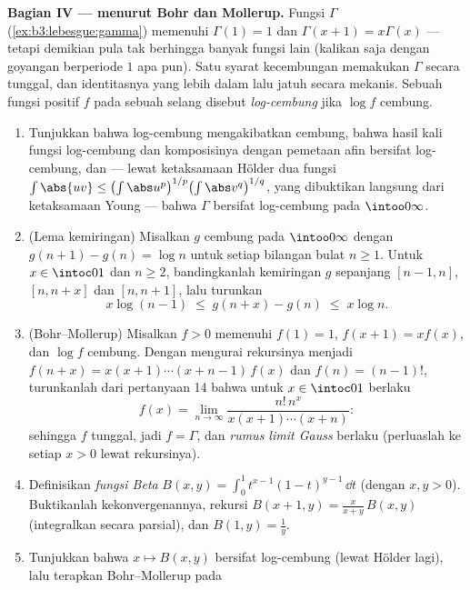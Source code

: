 \begin{problem}
\medskip
\noindent\textbf{Bagian IV ---  menurut
Bohr dan Mollerup.} Fungsi $\Gamma$
(\cref{ex:b3:lebesgue:gamma}) memenuhi $\Gamma(1) = 1$ dan
$\Gamma(x+1) = x\Gamma(x)$ --- tetapi demikian pula tak berhingga banyak
fungsi lain (kalikan saja dengan goyangan berperiode $1$ apa pun). Satu syarat
kecembungan memakukan $\Gamma$ secara tunggal, dan
identitasnya yang lebih dalam lalu jatuh secara mekanis. Sebuah fungsi positif $f$
pada sebuah selang disebut \emph{log-cembung} jika $\log f$ cembung.
\begin{enumerate}[resume]
  \item Tunjukkan bahwa log-cembung mengakibatkan cembung, bahwa hasil kali
        fungsi log-cembung dan komposisinya dengan pemetaan
        afin bersifat log-cembung, dan --- lewat
        ketaksamaan Hölder dua fungsi $\int\abs{uv} \leq
        \bigl(\int\abs u^p\bigr)^{1/p}\bigl(\int\abs
        v^q\bigr)^{1/q}$, yang dibuktikan langsung dari ketaksamaan
        Young --- bahwa $\Gamma$ bersifat log-cembung pada
        $\intoo0\infty$.
  \item (Lema kemiringan) Misalkan $g$ cembung pada $\intoo0\infty$
        dengan $g(n+1) - g(n) = \log n$ untuk setiap bilangan bulat $n
        \geq 1$. Untuk $x \in \intoc01$ dan $n \geq 2$, bandingkanlah
        kemiringan $g$ sepanjang $[n-1, n]$, $[n, n+x]$ dan
        $[n, n+1]$, lalu turunkan
        \[
        x\log(n-1) \;\leq\; g(n + x) - g(n) \;\leq\; x\log n .
        \]
  \item (Bohr--Mollerup) Misalkan $f > 0$ memenuhi $f(1) = 1$,
        $f(x+1) = xf(x)$, dan $\log f$ cembung. Dengan mengurai
        rekursinya menjadi $f(n + x) = x(x+1)\cdots(x + n -
        1)\,f(x)$ dan $f(n) = (n-1)!$, turunkanlah dari pertanyaan 14
        bahwa untuk $x \in \intoc01$ berlaku
        \[
        f(x) = \lim_{n\to\infty}
        \frac{n!\,n^x}{x(x+1)\cdots(x+n)} :
        \]
        sehingga $f$ tunggal, jadi $f = \Gamma$, dan \emph{rumus
        limit Gauss} berlaku (perluaslah ke setiap $x > 0$ lewat
        rekursinya).
  \item Definisikan \emph{fungsi Beta} $B(x, y) =
        \int_0^1t^{x-1}(1-t)^{y-1}\,\dd t$ (dengan $x, y > 0$). Buktikanlah
        kekonvergenannya, rekursi $B(x+1, y) =
        \frac{x}{x+y}\,B(x, y)$ (integralkan secara parsial), dan
        $B(1, y) = \frac1y$.
  \item Tunjukkan bahwa $x \mapsto B(x, y)$ bersifat log-cembung (lewat Hölder
        lagi), lalu terapkan Bohr--Mollerup pada
        \[
\]
\end{enumerate}
\end{problem}
